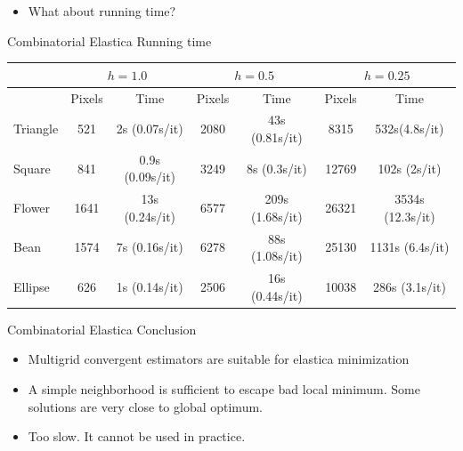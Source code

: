 \begin{frame}
\vspace{1em}
\pause

\begin{itemize}
\item{What about running time?}
\end{itemize}

\end{frame}

\begin{frame}
{Combinatorial Elastica}
{Running time}
\begin{center}
\captionsetup{type=table}
\scriptsize
\begin{tabular}{|l|c|c|c|c|c|c|}
\hline
& \multicolumn{2}{c|}{$h=1.0$} & \multicolumn{2}{c|}{$h=0.5$} & \multicolumn{2}{c|}{$h=0.25$}\\
\hline
& Pixels & Time & Pixels & Time & Pixels & Time\\
\hline
Triangle & 521 & 2s (0.07s/it)  & 2080 & 43s (0.81s/it) & 8315 & 532s(4.8s/it)\\
{\color{highlightcolor}Square} & 841 & 0.9s (0.09s/it) & 3249 & 8s (0.3s/it) & {\color{highlightcolor}12769} & {\color{highlightcolor}102s (2s/it)}\\
{\color{highlightcolor}Flower} & 1641 & 13s (0.24s/it) & 6577 & 209s (1.68s/it) & {\color{highlightcolor}26321} & {\color{highlightcolor}3534s (12.3s/it)}\\
Bean  & 1574 & 7s (0.16s/it) & 6278 & 88s (1.08s/it) & 25130 & 1131s (6.4s/it)\\
Ellipse  & 626 & 1s (0.14s/it) & 2506 & 16s (0.44s/it) & 10038 & 286s (3.1s/it)\\
\hline
\end{tabular}
\caption{\textbf{Running time of LocalSearch.} The running times for the free elastica problem are displayed. Notice that even having a similar number of pixels, the square (bean) shape evolves much faster than the triangle (flower).}
\end{center}
\end{frame}

\begin{frame}
{Combinatorial Elastica}
{Conclusion}

\begin{itemize}
\item{Multigrid convergent estimators are suitable for elastica minimization}\\[1em]
\item{A simple neighborhood is sufficient to escape bad local minimum. Some solutions are very close to global optimum.}\\[1em]
\item{Too slow. It cannot be used in practice.}
\end{itemize}
\end{frame}